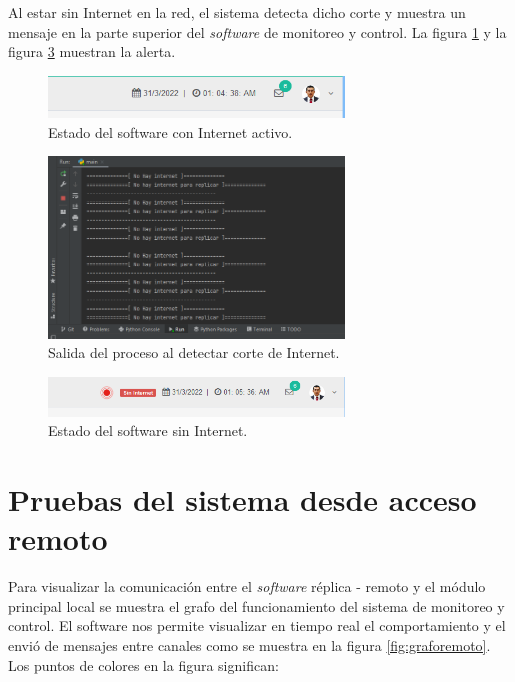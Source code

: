 Al estar sin Internet en la red, el sistema detecta dicho corte y muestra un mensaje en la parte superior del \emph{software} de monitoreo y control. La figura \ref{fig:inter2} y la figura \ref{fig:inter3} muestran la alerta.
\begin{figure}[htpb]
\centering 
\includegraphics[width=0.7\textwidth]{./Figures/test/replicador/desconexion1.png}
\caption{Estado del software con Internet activo.}
\label{fig:inter2}
\end{figure}
\begin{figure}[htpb]
\centering 
\includegraphics[width=0.7\textwidth]{./Figures/test/replicador/desconexion3.png}
\caption{Salida del proceso al detectar corte de Internet.}
\label{fig:inter1}
\end{figure}
\vspace{1.0cm}
\begin{figure}[htpb]
\centering 
\includegraphics[width=0.7\textwidth]{./Figures/test/replicador/desconexion2.png}
\caption{Estado del software sin Internet.}
\label{fig:inter3}
\end{figure}


\section{Pruebas del sistema desde acceso remoto}

Para visualizar la comunicación entre el \emph{software} réplica - remoto y el módulo principal local se muestra el grafo del funcionamiento del sistema de monitoreo y control. El software nos permite visualizar en tiempo real el comportamiento y el envió de mensajes entre canales como se muestra en la figura \ref{fig:graforemoto}. Los puntos de colores en la figura significan:

